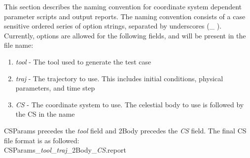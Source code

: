 This section describes the naming convention for coordinate system
dependent parameter scripts and output reports. The naming
convention consists of a case sensitive ordered series of option
strings, separated by underscores (\_ ). Currently, options are
allowed for the following fields, and will be present in the file
name:
\begin{enumerate}
  \item \emph{tool} - The tool used to generate the test case
  \item \emph{traj} - The trajectory to use.  This includes initial conditions, physical parameters, and time step
  \item \emph{CS} - The coordinate system to use. The celestial
  body to use is followed by the CS in the name
\end{enumerate}

CSParams precedes the \emph{tool} field and 2Body precedes the
\emph{CS} field. The final CS file format is as followed:\\
CSParams\_\emph{tool}\_\emph{traj}\_2Body\_\emph{CS}.report\\

